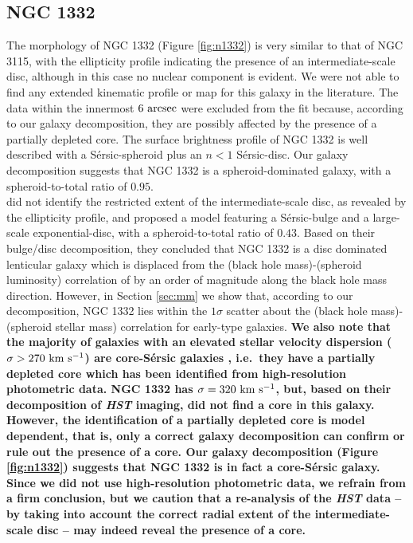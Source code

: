 \documentclass[useAMS,usenatbib,article]{mn2e}
\begin{document}
\subsection{NGC 1332}
The morphology of NGC 1332 (Figure \ref{fig:n1332}) is very similar to that of NGC 3115, 
with the ellipticity profile indicating the presence of an intermediate-scale disc, 
although in this case no nuclear component is evident. 
We were not able to find any extended kinematic profile or map 
for this galaxy in the literature. 
The data within the innermost $6~\rm arcsec$ were excluded from the fit 
because, according to our galaxy decomposition, they are possibly affected by the presence of a partially depleted core.
The surface brightness profile of NGC 1332 is well described with a S\'ersic-spheroid plus
an $n<1$ S\'ersic-disc. 
Our galaxy decomposition suggests that NGC 1332 is a spheroid-dominated galaxy, 
with a spheroid-to-total ratio of $0.95$. \\
\cite{rusli2011} did not identify the restricted extent of the intermediate-scale disc, 
as revealed by the ellipticity profile, 
and proposed a model featuring a S\'ersic-bulge and a large-scale exponential-disc, 
with a spheroid-to-total ratio of $0.43$.
Based on their bulge/disc decomposition, they concluded that NGC 1332 is a disc dominated lenticular galaxy 
which is displaced from the (black hole mass)-(spheroid luminosity) correlation of \cite{marconihunt2003} 
by an order of magnitude along the black hole mass direction. 
However, in Section \ref{sec:mm} we show that, according to our decomposition, 
NGC 1332 lies within the $1\sigma$ scatter about the (black hole mass)-(spheroid stellar mass) correlation 
for early-type galaxies. 
{\bf We also note that the majority of galaxies with an elevated stellar velocity dispersion ($\sigma > 270~\rm km~s^{-1}$) 
are core-S\'ersic galaxies \citep{graham2003coresersicmodel,trujillo2004coresersicmodel,dullograham2014cores}, 
i.e.~they have a partially depleted core which has been identified from high-resolution photometric data. 
NGC 1332 has $\sigma = 320~\rm km~s^{-1}$, but, 
based on their decomposition of \emph{HST} imaging, \cite{rusli2011} did not find a core in this galaxy. 
However, the identification of a partially depleted core is model dependent, 
that is, only a correct galaxy decomposition can confirm or rule out the presence of a core. 
Our galaxy decomposition (Figure \ref{fig:n1332}) suggests that NGC 1332 is in fact a core-S\'ersic galaxy. 
Since we did not use high-resolution photometric data, 
we refrain from a firm conclusion, 
but we caution that a re-analysis of the \emph{HST} data -- by taking into account the correct radial extent of the intermediate-scale disc --
may indeed reveal the presence of a core.}
\end{document}

